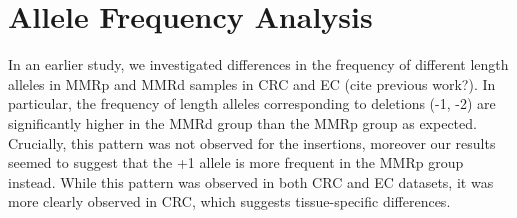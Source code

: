 \documentclass[fleqn,10pt]{olplainarticle}
\begin{document}
%
%
%

\section{Allele Frequency Analysis}

In an earlier study, we investigated differences in the frequency of different length alleles in MMRp and MMRd samples in CRC and EC (cite previous work?). In particular, the frequency of length alleles corresponding to deletions (-1, -2) are significantly higher in the MMRd group than the MMRp group as expected. Crucially, this pattern was not observed for the insertions, moreover our results seemed to suggest that the +1 allele is more frequent in the MMRp group instead. While this pattern was observed in both CRC and EC datasets, it was more clearly observed in CRC, which suggests tissue-specific differences.


%
%
\end{document}
